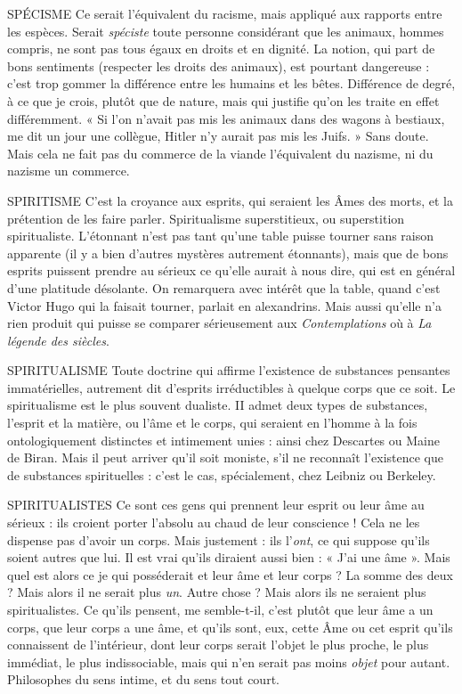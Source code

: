 SPÉCISME Ce serait l'équivalent du racisme, mais appliqué aux rapports
entre les espèces. Serait {\it spéciste} toute personne considérant que
les animaux, hommes compris, ne sont pas tous égaux en droits et en dignité.
La notion, qui part de bons sentiments (respecter les droits des animaux), est
pourtant dangereuse : c’est trop gommer la différence entre les humains et les
bêtes. Différence de degré, à ce que je crois, plutôt que de nature, mais qui justifie
qu’on les traite en effet différemment. « Si l’on n’avait pas mis les animaux
dans des wagons à bestiaux, me dit un jour une collègue, Hitler n’y aurait pas
mis les Juifs. » Sans doute. Mais cela ne fait pas du commerce de la viande
l'équivalent du nazisme, ni du nazisme un commerce.

SPIRITISME C'est la croyance aux esprits, qui seraient les Âmes des morts,
et la prétention de les faire parler. Spiritualisme superstitieux,
ou superstition spiritualiste. L’étonnant n’est pas tant qu’une table puisse
tourner sans raison apparente (il y a bien d’autres mystères autrement étonnants),
mais que de bons esprits puissent prendre au sérieux ce qu’elle aurait à
nous dire, qui est en général d’une platitude désolante. On remarquera avec
intérêt que la table, quand c’est Victor Hugo qui la faisait tourner, parlait en
alexandrins. Mais aussi qu’elle n’a rien produit qui puisse se comparer sérieusement
aux {\it Contemplations} où à {\it La légende des siècles}.

SPIRITUALISME Toute doctrine qui affirme l’existence de substances pensantes
immatérielles, autrement dit d’esprits irréductibles
à quelque corps que ce soit. Le spiritualisme est le plus souvent dualiste. II
admet deux types de substances, l'esprit et la matière, ou l'âme et le corps, qui
seraient en l’homme à la fois ontologiquement distinctes et intimement unies :
ainsi chez Descartes ou Maine de Biran. Mais il peut arriver qu’il soit moniste,
s’il ne reconnaît l’existence que de substances spirituelles : c’est le cas, spécialement,
chez Leibniz ou Berkeley.

SPIRITUALISTES Ce sont ces gens qui prennent leur esprit ou leur âme au
sérieux : ils croient porter l’absolu au chaud de leur
conscience ! Cela ne les dispense pas d’avoir un corps. Mais justement : ils l’{\it ont},
ce qui suppose qu'ils soient autres que lui. Il est vrai qu’ils diraient aussi bien :
« J'ai une âme ». Mais quel est alors ce je qui posséderait et leur âme et leur
corps ? La somme des deux ? Mais alors il ne serait plus {\it un}. Autre chose ? Mais
alors ils ne seraient plus spiritualistes. Ce qu’ils pensent, me semble-t-il, c’est
plutôt que leur âme a un corps, que leur corps a une âme, et qu’ils sont, eux,
cette Âme ou cet esprit qu’ils connaissent de l’intérieur, dont leur corps serait
l’objet le plus proche, le plus immédiat, le plus indissociable, mais qui n’en
serait pas moins {\it objet} pour autant. Philosophes du sens intime, et du sens tout
court.

